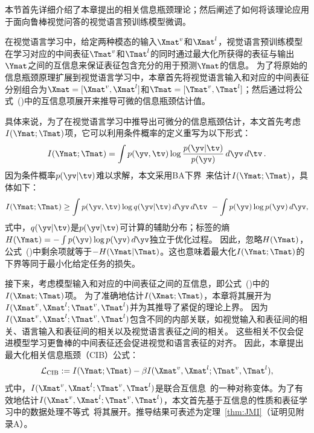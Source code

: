 
本节首先详细介绍了本章提出的相关信息瓶颈理论；然后阐述了如何将该理论应用于面向鲁棒视觉问答的视觉语言预训练模型微调。

\label{sec:CIB}

在视觉语言学习中，给定两种模态的输入$\Xmat^v$和$\Xmat^l$，视觉语言预训练模型在学习对应的中间表征$\Tmat^v$和$\Tmat^l$的同时通过最大化所获得的表征与输出$\Ymat$之间的互信息来保证表征包含充分的用于预测$\Ymat$的信息。
为了将原始的信息瓶颈原理扩展到视觉语言学习中，本章首先将视觉语言输入和对应的中间表征分别组合为$\Xmat=[\Xmat^v, \Xmat^l]$和$\Tmat=[\Tmat^v, \Tmat^l]$；然后通过将公式~()中的互信息项展开来推导可微的信息瓶颈估计值。

具体来说，为了在视觉语言学习中推导出可微分的信息瓶颈估计，本文首先考虑$I(\Ymat; \Tmat)$项，它可以利用条件概率的定义重写为以下形式：
\begin{equation}
\begin{aligned}
I(\Ymat; \Tmat) = \int p(\yv, \tv) \log \frac{p(\yv|\tv)}{p(\yv)} \, {d\yv \, d\tv \,}. 
\end{aligned}
\label{eq:mi}
\end{equation} 
因为条件概率$p(\yv|\tv)$难以求解，本文采用BA下界~\cite{agakov2004algorithm}来估计$I(\Ymat; \Tmat)$，具体如下：
\begin{equation}
\begin{aligned}
I(\Ymat; \Tmat) \ge \int p(\yv, \tv) \log q(\yv|\tv) \, {d\yv \, d\tv \,}\, - \int p(\yv) \log p(\yv)\, d\yv, 
\end{aligned}
\label{eq:lower}
\end{equation}
式中，$q(\yv|\tv)$是$p(\yv|\tv)$可计算的辅助分布；标签的熵$H(\Ymat) = - \int p(\yv) \log p(\yv)\, d\yv$独立于优化过程。
因此，忽略$H(\Ymat)$，公式~()中剩余项就等于$-H(\Ymat|\Tmat)$。这也意味着最大化$I(\Ymat; \Tmat)$的下界等同于最小化给定任务的损失。


接下来，考虑模型输入和对应的中间表征之间的互信息，即公式~()中的$I(\Xmat; \Tmat)$项。
为了准确地估计$I(\Xmat; \Tmat)$，本章将其展开为$I(\Xmat^v, \Xmat^l; \Tmat^v, \Tmat^l)$并为其推导了紧促的理论上界。
因为$I(\Xmat^v, \Xmat^l; \Tmat^v, \Tmat^l)$包含不同的内部关联，如视觉输入和表征间的相关、语言输入和表征间的相关以及视觉语言表征之间的相关。
这些相关不仅会促进模型学习更鲁棒的中间表征还会促进视觉和语言表征的对齐。
因此，本章提出最大化相关信息瓶颈（CIB）公式：
\begin{equation}
\begin{aligned} 
\mathcal{L}_{\text{CIB}} := I(\Ymat; \Tmat) - \beta I(\Xmat^v, \Xmat^l; \Tmat^v, \Tmat^l), 
\end{aligned}
\label{eq:CIB}
\end{equation}
式中，$I(\Xmat^v, \Xmat^l; \Tmat^v, \Tmat^l)$是联合互信息~\cite{bennasar2015feature}的一种对称变体。为了有效地估计$I(\Xmat^v, \Xmat^l; \Tmat^v, \Tmat^l)$，本文首先基于互信息的性质和表征学习中的数据处理不等式~\cite{federici2020learning}将其展开。推导结果可表述为定理~\ref{thm:JMI}（证明见附录A）。

